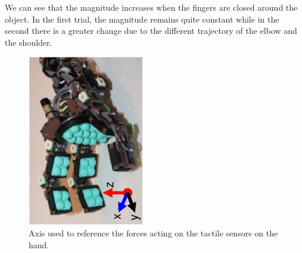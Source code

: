 We can see that the magnitude increases when the fingers are
closed around the object. In the first trial, the magnitude
remains quite constant while in the second there is a greater
change due to the different trajectory of the elbow and the
shoulder.

\begin{figure}[tbp]
\centerline{
\includegraphics[width=2.0in, angle=270 ]{./figures/refaxis.eps}
} \caption[Axis of reference for tactile sensors]{Axis used to
reference the forces acting on the tactile sensors on the hand.}
\label{fig:tactileref}
\end{figure}


